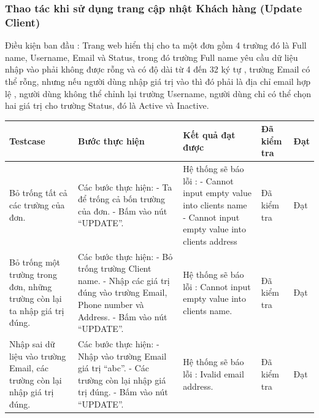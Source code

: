 \documentclass[a4paper]{article}
\begin{document}
\subsubsection*{Thao tác khi sử dụng trang cập nhật Khách hàng (Update Client) }
Điều kiện ban đầu : Trang web hiển thị cho ta một đơn gồm 4 trường đó là Full name, Username, Email và Status, trong đó trường Full name yêu cầu dữ liệu nhập vào phải không được rỗng và có độ dài từ 4 đến 32 ký tự , trường Email có thể rỗng, nhưng nếu người dùng nhập giá trị vào thì đó phải là địa chỉ email hợp lệ , người dùng không thể chỉnh lại trường Username, người dùng chỉ có thể chọn hai giá trị cho trường Status, đó là Active và Inactive.  \newline
\begin{longtable}{ | p{} |p{} | p{}  | p{}  | p{}  | } 
\hline
\textbf{Testcase}& \textbf{Bước thực hiện}& \textbf{Kết quả đạt được} & \textbf{Đã kiểm tra}& \textbf{Đạt} \\ 
\hline
\hline
Bỏ trống tất cả các trường của đơn. &
Các bước thực hiện: \newline
- Ta để trống cả bốn trường của đơn. \newline
- Bấm vào nút “UPDATE”.
&
Hệ thống sẽ báo lỗi :  \newline
- Cannot input empty value into clients name \newline
- Cannot input empty value into clients address
&
Đã kiểm tra &
Đạt \\

\hline
Bỏ trống một trường trong đơn, những trường còn lại ta nhập giá trị đúng. &
Các bước thực hiện: \newline
- Bỏ trống trường Client name.  \newline
- Nhập các giá trị đúng vào trường Email, Phone number và Address. \newline
- Bấm vào nút “UPDATE”.
&
Hệ thống sẽ báo lỗi :  Cannot input empty value into clients name.
&
Đã kiểm tra &
Đạt \\

\hline
Nhập sai dữ liệu vào trường Email, các trường còn lại nhập giá trị đúng. &
Các bước thực hiện: \newline
- Nhập vào trường Email giá trị  “abc”.  \newline
- Các trường còn lại nhập giá trị đúng. \newline
- Bấm vào nút “UPDATE”.
&
Hệ thống sẽ báo lỗi :  Ivalid email address.
&
Đã kiểm tra &
Đạt \\


\end{longtable}
\end{document}
